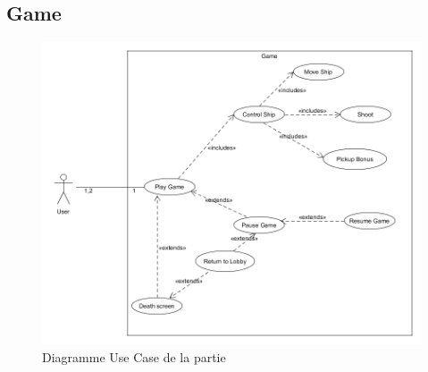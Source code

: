 \documentclass[french]{article}
\begin{document}
\subsection{Game}
\begin{figure}[!htbp]
    \centering
    \includegraphics[scale=0.5]{use_case/use-case-game.png}
    \caption{Diagramme Use Case de la partie}
    \label{use case:game}
\end{figure}
\newpage
\end{document}
